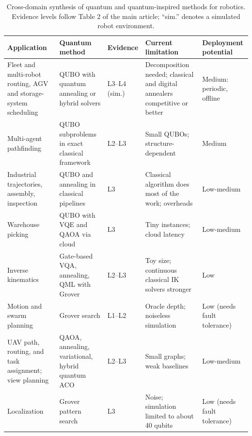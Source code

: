 \documentclass[acmsmall,screen,review]{acmart}
\begin{document}
\begin{table}[p]
\caption{Cross-domain synthesis of quantum and quantum-inspired methods for robotics. Evidence levels follow Table 2 of the main article; ``sim.'' denotes a simulated robot environment.}
\label{tab:synthesis}
\footnotesize
\begin{tabular}{@{}>{\raggedright\arraybackslash}p{0.270\dimexpr\linewidth-10\tabcolsep\relax}>{\raggedright\arraybackslash}p{0.210\dimexpr\linewidth-10\tabcolsep\relax}>{\raggedright\arraybackslash}p{0.100\dimexpr\linewidth-10\tabcolsep\relax}>{\raggedright\arraybackslash}p{0.240\dimexpr\linewidth-10\tabcolsep\relax}>{\raggedright\arraybackslash}p{0.180\dimexpr\linewidth-10\tabcolsep\relax}@{}}
\toprule
\textbf{Application} & \textbf{Quantum method} & \textbf{Evidence} & \textbf{Current limitation} & \textbf{Deployment potential} \\ \midrule
Fleet and multi-robot routing, AGV and storage-system scheduling~\cite{Ohzeki2019,Clark2019,Quang2025,Smierzchalski2024,Leib2023,Windmann2023} & QUBO with quantum annealing or hybrid solvers & L3--L4 (sim.) & Decomposition needed; classical and digital annealers competitive or better & Medium: periodic, offline \\
Multi-agent pathfinding~\cite{Gerlach2025,GonzalezVillasmil2026} & QUBO subproblems in exact classical framework & L2--L3 & Small QUBOs; structure-dependent & Medium \\
Industrial trajectories, assembly, inspection~\cite{Schuetz2022,Willmann2025,Osaba2025} & QUBO and annealing in classical pipelines & L3 & Classical algorithm does most of the work; overheads & Low-medium \\
Warehouse picking~\cite{AtchadeAdelomou2021} & QUBO with VQE and QAOA via cloud & L3 & Tiny instances; cloud latency & Low-medium \\
Inverse kinematics~\cite{Otani2025,Salloum2026,Nigatu2025} & Gate-based VQA, annealing, QML with Grover & L2--L3 & Toy size; continuous classical IK solvers stronger & Low \\
Motion and swarm planning~\cite{Benioff2002,Chella2022,Chella2023,Lathrop2023} & Grover search & L1--L2 & Oracle depth; noiseless simulation & Low (needs fault tolerance) \\
UAV path, routing, and task assignment; view planning~\cite{Innan2025,Yu2025,Sarkar2024,OsabaDrone2025,Bang2026} & QAOA, annealing, variational, hybrid quantum ACO & L2--L3 & Small graphs; weak baselines & Low-medium \\
Localization~\cite{Antero2025} & Grover pattern search & L3 & Noise; simulation limited to about 40 qubits & Low (needs fault tolerance) \\

\end{tabular}
\end{table}
\end{document}
